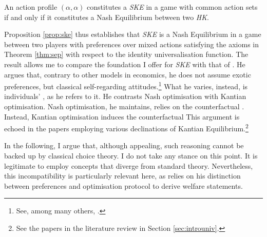 \begin{prop}\label{prop:ske}
	An action profile \( (\alpha, \alpha) \) constitutes a \textit{SKE} in a game with common action sets if and only if it constitutes a Nash Equilibrium between two \textit{HK}.
\end{prop}

Proposition \ref{prop:ske} thus establishes that \textit{SKE} is a Nash Equilibrium in a game between two players with preferences over mixed actions satisfying the axioms in Theorem \ref{thm:sep} with respect to the identity universalisation function. The result allows me to compare the foundation I offer for \textit{SKE} with that of \cite{roemer2019cooperate}. He argues that, contrary to other models in economics, he does not assume exotic preferences, but classical self-regarding attitudes.\footnote{See, among many others, \citet[p. 69]{roemer2019cooperate}.} What he varies, instead, is individuals' , as he refers to it. He contrasts Nash optimisation with Kantian optimisation. Nash optimisation, he maintains, relies on the counterfactual . Instead, Kantian optimisation induces the counterfactual  This argument is echoed in the papers employing various declinations of Kantian Equilibrium.\footnote{See the papers in the literature review in Section \ref{sec:introuniv}.}

In the following, I argue that, although appealing, such reasoning cannot be backed up by classical choice theory. I do not take any stance on this point. It is legitimate to employ concepts that diverge from standard theory. Nevertheless, this incompatibility is particularly relevant here, as \citeauthor{roemer2019cooperate} relies on his distinction between preferences and optimisation protocol to derive welfare statements.

